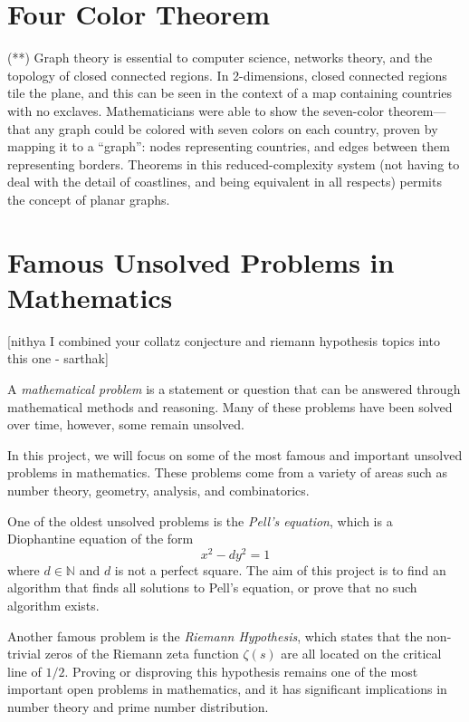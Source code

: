 \documentclass{article}
\begin{document}
\pagebreak

\section{Four Color Theorem} (**)
    Graph theory is essential to computer science, networks theory, and the topology of closed connected regions.
    In 2-dimensions, closed connected regions tile the plane, and this can be seen in the context of a map containing countries with no exclaves.
    Mathematicians were able to show the seven-color theorem---that any graph could be colored with seven colors on each country, proven by mapping it to a ``graph'': nodes representing countries, and edges between them representing borders.
    Theorems in this reduced-complexity system (not having to deal with the detail of coastlines, and being equivalent in all respects) permits the concept of planar graphs.

\pagebreak

\section{Famous Unsolved Problems in Mathematics}
    [nithya  I combined your collatz conjecture and riemann hypothesis topics into this one - sarthak]
    
    A \textit{mathematical problem} is a statement or question that can be answered through mathematical methods and reasoning. Many of these problems have been solved over time, however, some remain unsolved.
    
    
    \vspace{3mm}
    In this project, we will focus on some of the most famous and important unsolved problems in mathematics. These problems come from a variety of areas such as number theory, geometry, analysis, and combinatorics. 
    
    \vspace{3mm}
    One of the oldest unsolved problems is the \textit{Pell's equation}, which is a Diophantine equation of the form $$x^2 - dy^2 = 1$$ where $d \in \mathbb{N}$ and $d$ is not a perfect square. The aim of this project is to find an algorithm that finds all solutions to Pell's equation, or prove that no such algorithm exists.
    
    \vspace{3mm}
    Another famous problem is the \textit{Riemann Hypothesis}, which states that the non-trivial zeros of the Riemann zeta function $\zeta(s)$ are all located on the critical line of $1/2$. Proving or disproving this hypothesis remains one of the most important open problems in mathematics, and it has significant implications in number theory and prime number distribution. 
    
\end{document}
